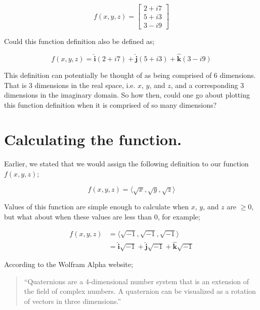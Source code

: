 \documentclass{article}
\begin{document}
\begin{equation*}
f(x,y,z) = 
\begin{bmatrix}
2 + i7 \\
5 + i3 \\
3 - i9
\end{bmatrix}
\end{equation*}

Could this function definition also be defined as;

\begin{equation*}
f(x,y,z) = \hat{\mathrm{\bm{i}}}(2 + i7) + \hat{\mathrm{\bm{j}}}(5 + i3) + \hat{\mathrm{\bm{k}}}(3 - i9)
\end{equation*}

This definition can potentially be thought of as being comprised of 6 dimensions. That is 3 dimensions in
the real space, i.e. $x$, $y$, and $z$, and a corresponding 3 dimensions in the imaginary domain. So how then, could
one go about plotting this function definition when it is comprised of so many dimensions?

\newpage
\section{Calculating the function.}

Earlier, we stated that we would assign the following definition to our function $f(x,y,z)$;

\begin{equation*}
  f(x,y,z) = \langle \sqrt{x}, \sqrt{y}, \sqrt{z} \rangle
\end{equation*}

Values of this function are simple enough to calculate when $x$, $y$, and $z$ are $\geq 0$, but what about when
these values are less than 0, for example;

\begin{align*}
  f(x,y,z) &= \langle \sqrt{-1}, \sqrt{-1}, \sqrt{-1} \rangle \\
           &= \hat{\mathrm{\bm{i}}}\sqrt{-1} + \hat{\mathrm{\bm{j}}}\sqrt{-1} + \hat{\mathrm{\bm{k}}}\sqrt{-1}
\end{align*}

According to the Wolfram Alpha website;

\begin{quote}
``Quaternions are a 4-dimensional number system that is an
extension of the field of complex numbers. A quaternion can be visualized as a rotation of vectors in three dimensions.''
\end{quote}
\end{document}
